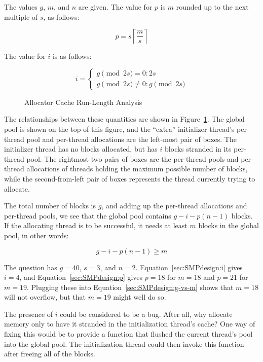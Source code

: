 {{	The values $g$, $m$, and $n$ are given.  The value for $p$ is
	$m$ rounded up to the next multiple of $s$, as follows:

	\begin{equation}
		p = s \left \lceil \frac{m}{s} \right \rceil
	\label{sec:SMPdesign:p}
	\end{equation}

	The value for $i$ is as follows:

	\begin{equation}
		i = \left \{
			\begin{array}{l}
				g \pmod{2 s} = 0: 2 s \\
				g \pmod{2 s} \ne 0: g \pmod{2 s}
			\end{array}
		    \right .
	\label{sec:SMPdesign:i}
	\end{equation}

	\begin{figure}[tb]
	\centering
	\caption{Allocator Cache Run-Length Analysis}
	\label{fig:SMPdesign:Allocator Cache Run-Length Analysis}
	\end{figure}

	The relationships between these quantities are shown in
	Figure~\ref{fig:SMPdesign:Allocator Cache Run-Length Analysis}.
	The global pool is shown on the top of this figure, and
	the ``extra'' initializer thread's per-thread pool and
	per-thread allocations are the left-most pair of boxes.
	The initializer thread has no blocks allocated, but has
	$i$ blocks stranded in its per-thread pool.
	The rightmost two pairs of boxes are the per-thread pools and
	per-thread allocations of threads holding the maximum possible
	number of blocks, while the second-from-left pair of boxes
	represents the thread currently trying to allocate.

	The total number of blocks is $g$, and adding up the per-thread
	allocations and per-thread pools, we see that the global pool
	contains $g-i-p(n-1)$ blocks.
	If the allocating thread is to be successful, it needs at least
	$m$ blocks in the global pool, in other words:

	\begin{equation}
		g - i - p(n - 1) \ge m
	\label{sec:SMPdesign:g-vs-m}
	\end{equation}

	The question has $g=40$, $s=3$, and $n=2$.
	Equation~\ref{sec:SMPdesign:i} gives $i=4$, and
	Equation~\ref{sec:SMPdesign:p} gives $p=18$ for $m=18$
	and $p=21$ for $m=19$.
	Plugging these into Equation~\ref{sec:SMPdesign:g-vs-m}
	shows that $m=18$ will not overflow, but that $m=19$ might
	well do so.

	The presence of $i$ could be considered to be a bug.
	After all, why allocate memory only to have it stranded in
	the initialization thread's cache?
	One way of fixing this would be to provide a 
	function that flushed the current thread's pool into the
	global pool.
	The initialization thread could then invoke this function
	after freeing all of the blocks.
}\QuickQuizEndE
}

